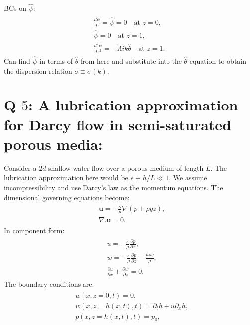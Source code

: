 \documentclass{article}
\begin{document}
BCs on $\hat{\psi}$: 
\begin{align}
 \begin{split}
  \frac{d \hat{\psi}}{dz} = \hat{\psi} = 0 \quad \textrm{at } z = 0,\\
  \hat{\psi} = 0 \quad \textrm{at } z = 1,\\
  \frac{d^{2} \hat{\psi}}{dz^{2}} = -\tilde{\Lambda} i k \hat{\theta} \quad \textrm{at } z = 1. 
 \end{split}
\end{align}
 Can find $\hat{\psi}$ in terms of $\hat{\theta}$ from here and substitute into the $\hat{\theta}$ equation to obtain the dispersion relation $\sigma \equiv \sigma(k)$. 
\section{Q $5$: A lubrication approximation for Darcy flow in semi-saturated porous media: }
Consider a $2d$ shallow-water flow over a porous medium of length $L$. The lubrication approximation here would be $\epsilon \equiv h/L \ll 1$.  We assume incompressibility and use Darcy's law as the momentum equations. The dimensional governing equations become:
\begin{align}
 \begin{split}
  & \boldsymbol{u} = -\frac{\kappa}{\mu}\nabla(p + \rho g z),\\
  & \nabla.\boldsymbol{u} = 0.
 \end{split}
 \end{align}
%
In component form:
\begin{align}\label{eq:lub_darcy_flow_dim}
 \begin{split}
  & u = -\frac{\kappa}{\mu}\frac{\partial p}{\partial x},\\
  & w = -\frac{\kappa}{\mu}\frac{\partial p}{\partial z} -\frac{\kappa \rho g}{\mu},\\
  & \frac{\partial u}{\partial x} + \frac{\partial w}{\partial z} = 0.
 \end{split}
 \end{align}
%
 The boundary conditions are:
 \begin{align}\label{eq:lub_darcy_flow_bcs_dim}
  \begin{split}
   & w(x, z= 0, t) = 0,\\
   & w(x, z= h(x,t), t) = \partial_{t}h + u \partial_{x}h,\\
   & p(x, z=h(x,t), t) = p_{0},
  \end{split}
 \end{align}
\end{document}
